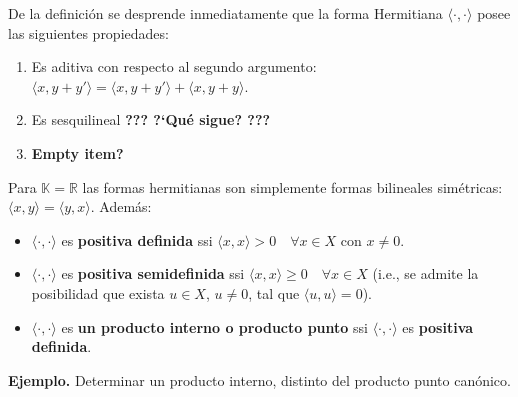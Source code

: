 \smallskip\noindent
De la definici\'on se desprende inmediatamente que la forma Hermitiana
$\langle\cdot,\cdot\rangle$ posee las siguientes propiedades:
\begin{enumerate}
\item
Es aditiva con respecto al segundo argumento:
$\langle x,y+y'\rangle = \langle x,y+y'\rangle+\langle x,y+y\rangle$.
\item
Es sesquilineal {\color{red}\bf ??? ?`Qu\'e sigue? ???}
\item
{\color{red}\bf Empty item?}
\end{enumerate}

\smallskip\noindent
Para $\mathbb{K}=\mathbb{R}$ las formas hermitianas son simplemente
formas bilineales sim\'etricas: 
$\langle x,y \rangle= \langle y,x \rangle$.
Adem\'as:
\begin{itemize}
\item
$\langle\cdot,\cdot\rangle$ es \textbf{positiva definida} ssi
$\langle x,x\rangle > 0\quad\forall x\in X$ con $x\neq0$.
\item
$\langle\cdot,\cdot\rangle$ es \textbf{positiva semidefinida} ssi
$\langle x,x\rangle\geq0\quad\forall x\in X$
(i.e., se admite la posibilidad que exista $u\in X$, $u\neq0$,
tal que $\langle u,u\rangle=0$).
\item
$\langle\cdot,\cdot \rangle$  es 
\textbf{un producto interno o producto punto} ssi 
$\langle\cdot,\cdot\rangle$ es \textbf{positiva definida}.
\end{itemize}

\medskip\noindent
\textbf{Ejemplo.}
Determinar un producto interno, distinto del producto punto can\'onico.

